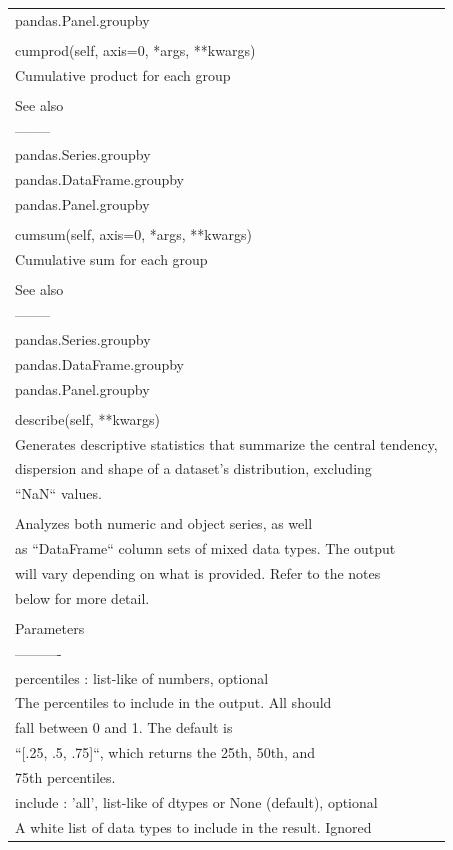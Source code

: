 \documentclass[11pt]{article}
\begin{document}
\begin{enumerate}
\begin{enumerate}
\begin{enumerate}
\begin{center}
\begin{tabular}{l}
pandas.Panel.groupby\\
\\
cumprod(self, axis=0, *args, **kwargs)\\
Cumulative product for each group\\
\\
See also\\
--------\\
pandas.Series.groupby\\
pandas.DataFrame.groupby\\
pandas.Panel.groupby\\
\\
cumsum(self, axis=0, *args, **kwargs)\\
Cumulative sum for each group\\
\\
See also\\
--------\\
pandas.Series.groupby\\
pandas.DataFrame.groupby\\
pandas.Panel.groupby\\
\\
describe(self, **kwargs)\\
Generates descriptive statistics that summarize the central tendency,\\
dispersion and shape of a dataset's distribution, excluding\\
``NaN`` values.\\
\\
Analyzes both numeric and object series, as well\\
as ``DataFrame`` column sets of mixed data types. The output\\
will vary depending on what is provided. Refer to the notes\\
below for more detail.\\
\\
Parameters\\
----------\\
percentiles : list-like of numbers, optional\\
The percentiles to include in the output. All should\\
fall between 0 and 1. The default is\\
``[.25, .5, .75]``, which returns the 25th, 50th, and\\
75th percentiles.\\
include : 'all', list-like of dtypes or None (default), optional\\
A white list of data types to include in the result. Ignored\\

\end{tabular}
\end{center}
\end{enumerate}
\end{enumerate}
\end{enumerate}
\end{document}
